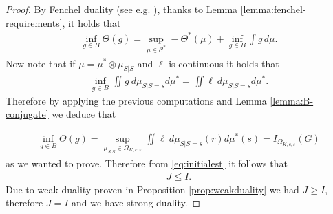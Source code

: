 \documentclass{article}
\newcommand{\Okc}{\Omega_{K, c, \varepsilon}}
\theoremstyle{definition}
\theoremstyle{remarksty}
\newtheorem{remark}{Remark}[section]
\begin{document}
\begin{proof}
By Fenchel duality (see e.g. \cite[Theorem 1, Page 201]{luenberger_optimization_1997}), thanks to Lemma \ref{lemma:fenchel-requirements}, it holds that 
\begin{align*}
    \inf_{g\in B} \Theta(g) = \sup_{\mu \in \mathcal{C}^*} - \Theta^*(\mu) + \inf_{g \in B} \int g \, d\mu.
\end{align*}
Now note that if $\mu = \mu^* \otimes \mu_{S|S}$ and $\ell$ is continuous it holds that
    \begin{align*}
        \inf_{g \in B} \iint g\ d\mu_{S|S=s} d\mu^* = \iint \ell\ d\mu_{S|S=s} d\mu^*.
    \end{align*}
Therefore by applying the previous computations and Lemma \ref{lemma:B-conjugate} we deduce that 

\begin{align*}
    \inf_{g\in B} \Theta(g) = \sup_{\mu_{S|S} \in \Okc} \iint \ell\ d\mu_{S|S=s}(r) d\mu^*(s) = I_{\Okc}(G)
\end{align*}
as we wanted to prove.
 Therefore from \eqref{eq:initialest} it follows that 
    \begin{align*}
    J \leq I.
    \end{align*}
Due to weak duality proven in Proposition \ref{prop:weakduality} we had $J \geq I$, therefore $J=I$ and we have strong duality.
\end{proof}


\end{document}
